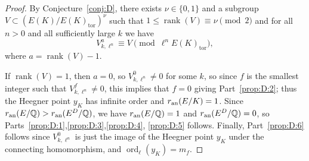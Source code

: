 \documentclass{oupau}
\DeclareMathOperator{\ord}{ord}
\DeclareMathOperator{\rank}{rank}
\DeclareMathOperator{\tor}{tor}
\newcommand{\an}{{\rm an}}
\newcommand{\QQ}{\mathbb{Q}}
\begin{document}
\begin{proof}
By Conjecture~\ref{conj:D}, there exists $\nu\in\{0,1\}$ and a subgroup
$V\subset (E(K)/E(K)_{\tor})^{\nu}$ such that $1\leq \rank(V) \equiv \nu\pmod{2}$
and for all $n>0$ and all sufficiently large $k$ we have
$$
  V_{k,\ell^n}^a \equiv V \pmod{ \ell^n E(K)_{\tor} },
$$
where $a = \rank(V) - 1$.  

If $\rank(V)=1$, then $a=0$, so $V_{k,\ell^n}^0 \neq 0$ for some $k$,
so since $f$ is the smallest integer such that $V_{k,\ell^n}^f \neq 0$,
this implies that $f=0$ giving Part~\ref{prop:D:2}; thus the Heegner
point $y_K$ has infinite order and $r_{\an}(E/K) = 1$.  Since
$r_{\an}(E/\QQ) > r_{\an}(E^D/\QQ)$, we have $r_{\an}(E/\QQ)=1$ and
$r_{\an}(E^D/\QQ)=0$, so
Parts~\ref{prop:D:1},\ref{prop:D:3},\ref{prop:D:4}, \ref{prop:D:5}
follows.  Finally, Part~\ref{prop:D:6} follows since $V_{k,\ell^n}^0$
is just the image of the Heegner point $y_K$ under the connecting
homomorphism, and $\ord_{\ell}(y_K) = m_f$.


\end{proof}
\end{document}
